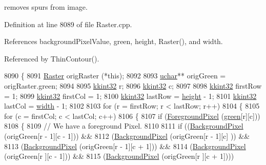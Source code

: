 removes spurs from image. 



Definition at line 8089 of file Raster.\+cpp.



References background\+Pixel\+Value, green, height, Raster(), and width.



Referenced by Thin\+Contour().


\begin{DoxyCode}
8090 \{
8091   \hyperlink{class_k_k_b_1_1_raster}{Raster}  origRaster (*\textcolor{keyword}{this});
8092 
8093   \hyperlink{namespace_k_k_b_ace9969169bf514f9ee6185186949cdf7}{uchar}**  origGreen = origRaster.green;
8094 
8095   \hyperlink{namespace_k_k_b_a8fa4952cc84fda1de4bec1fbdd8d5b1b}{kkint32}  r;
8096   \hyperlink{namespace_k_k_b_a8fa4952cc84fda1de4bec1fbdd8d5b1b}{kkint32}  c;
8097 
8098   \hyperlink{namespace_k_k_b_a8fa4952cc84fda1de4bec1fbdd8d5b1b}{kkint32}  firstRow = 1;
8099   \hyperlink{namespace_k_k_b_a8fa4952cc84fda1de4bec1fbdd8d5b1b}{kkint32}  firstCol = 1;
8100   \hyperlink{namespace_k_k_b_a8fa4952cc84fda1de4bec1fbdd8d5b1b}{kkint32}  lastRow  = \hyperlink{class_k_k_b_1_1_raster_af39ff189de4fbb6de98392e187efafb7}{height} - 1;
8101   \hyperlink{namespace_k_k_b_a8fa4952cc84fda1de4bec1fbdd8d5b1b}{kkint32}  lastCol  = \hyperlink{class_k_k_b_1_1_raster_ae0bcc103e191c3421d7692dc69ceb554}{width} - 1;
8102 
8103   \textcolor{keywordflow}{for}  (r = firstRow; r < lastRow; r++)
8104   \{
8105     \textcolor{keywordflow}{for}  (c = firstCol; c < lastCol; c++)
8106     \{
8107       \textcolor{keywordflow}{if}  (\hyperlink{class_k_k_b_1_1_raster_aa1e1363589e719eb64f0957281b84b6a}{ForegroundPixel} (\hyperlink{class_k_k_b_1_1_raster_a2d2238911145488e226cd2e34fc8448c}{green}[r][c]))
8108       \{
8109         \textcolor{comment}{// We have a foreground Pixel.}
8110 
8111         \textcolor{keywordflow}{if}  ((\hyperlink{class_k_k_b_1_1_raster_a0756fb5530274d5e28858d3e1633d595}{BackgroundPixel} (origGreen[r - 1][c - 1]))  &&
8112              (\hyperlink{class_k_k_b_1_1_raster_a0756fb5530274d5e28858d3e1633d595}{BackgroundPixel} (origGreen[r - 1][c]    ))  &&
8113              (\hyperlink{class_k_k_b_1_1_raster_a0756fb5530274d5e28858d3e1633d595}{BackgroundPixel} (origGreen[r - 1][c + 1]))  &&
8114              (\hyperlink{class_k_k_b_1_1_raster_a0756fb5530274d5e28858d3e1633d595}{BackgroundPixel} (origGreen[r    ][c - 1]))  &&
8115              (\hyperlink{class_k_k_b_1_1_raster_a0756fb5530274d5e28858d3e1633d595}{BackgroundPixel} (origGreen[r    ][c + 1])))

\end{DoxyCode}
